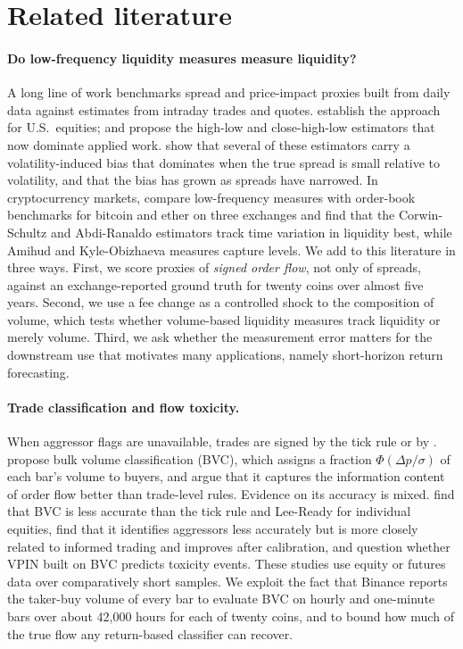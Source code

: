 \section{Related literature}\label{sec:lit}

\paragraph{Do low-frequency liquidity measures measure liquidity?} A long line of work benchmarks
spread and price-impact proxies built from daily data against estimates from intraday trades and
quotes. \citet{goyenko2009} establish the approach for U.S.\ equities; \citet{corwin2012} and
\citet{abdi2017} propose the high-low and close-high-low estimators that now dominate applied work.
\citet{jahanparvar2023} show that several of these estimators carry a volatility-induced bias that
dominates when the true spread is small relative to volatility, and that the bias has grown as
spreads have narrowed. In cryptocurrency markets, \citet{brauneis2021} compare low-frequency
measures with order-book benchmarks for bitcoin and ether on three exchanges and find that the
Corwin-Schultz and Abdi-Ranaldo estimators track time variation in liquidity best, while Amihud
and Kyle-Obizhaeva measures capture levels. We add to this literature in three ways. First, we score
proxies of \emph{signed order flow}, not only of spreads, against an exchange-reported ground truth
for twenty coins over almost five years. Second, we use a fee change as a controlled shock to the
composition of volume, which tests whether volume-based liquidity measures track liquidity or merely
volume. Third, we ask whether the measurement error matters for the downstream use that motivates
many applications, namely short-horizon return forecasting.

\paragraph{Trade classification and flow toxicity.} When aggressor flags are unavailable, trades are
signed by the tick rule or by \citet{leeready1991}. \citet{easley2012,easley2016} propose bulk volume
classification (BVC), which assigns a fraction $\Phi(\Delta p/\sigma)$ of each bar's volume to buyers,
and argue that it captures the information content of order flow better than trade-level rules.
Evidence on its accuracy is mixed. \citet{chakrabarty2015} find that BVC is less accurate than the
tick rule and Lee-Ready for individual equities, \citet{panayides2019} find that it identifies
aggressors less accurately but is more closely related to informed trading and improves after
calibration, and \citet{andersen2014} question whether VPIN built on BVC predicts toxicity events.
These studies use equity or futures data over comparatively short samples. We exploit the fact
that Binance reports the taker-buy volume of every bar to evaluate BVC on hourly and one-minute bars
over about 42{,}000 hours for each of twenty coins, and to bound how much of the true flow any
return-based classifier can recover.

